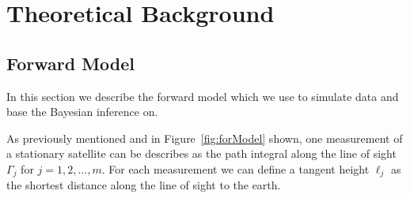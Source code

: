 \chapter{Theoretical Background}

\section{Forward Model}

\begin{figure}[ht!]
	\centering
	\scalebox{0.9}{}
	\label{fig:FirstLIMB}
\end{figure}

In this section we describe the forward model which we use to simulate data and base the Bayesian inference on.

As previously mentioned and in Figure~\ref{fig:forModel} shown, one measurement of a stationary satellite can be describes as the path integral along the line of sight $\Gamma_j$ for $j=1,2,\ldots,m$.
For each measurement we can define a tangent height $\ell_j$ as the shortest distance along the line of sight to the earth.


